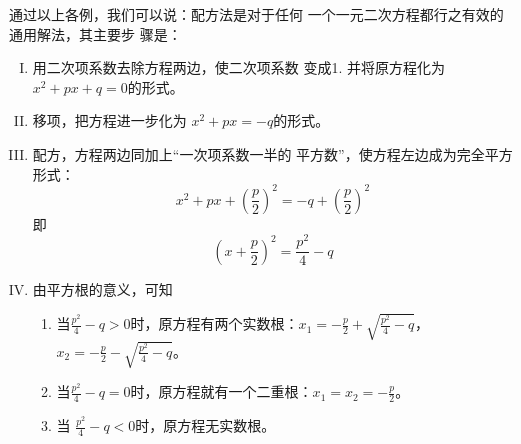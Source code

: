 通过以上各例，我们可以说：配方法是对于任何
一个一元二次方程都行之有效的通用解法，其主要步
骤是：
\begin{blk}{}
\begin{enumerate}[I. ]
    \item 用二次项系数去除方程两边，使二次项系数
    变成1. 并将原方程化为$x^2+px+q=0$的形式。
    \item 移项，把方程进一步化为
    $x^2+px=-q$的形式。
    \item 配方，方程两边同加上“一次项系数一半的
    平方数”，使方程左边成为完全平方形式：
    \[x^2+px+\left(\frac{p}{2}\right)^2=-q+\left(\frac{p}{2}\right)^2\]
    即
    \[\left(x+\frac{p}{2}\right)^2=\frac{p^2}{4}-q\]
    \item 由平方根的意义，可知
\begin{enumerate}[1.]
    \item 当$\frac{p^2}{4}-q>0$时，原方程有两个实数根：$x_1=-\frac{p}{2}+\sqrt{\frac{p^2}{4}-q}$，$x_2=-\frac{p}{2}-\sqrt{\frac{p^2}{4}-q}$。
    \item 当$\frac{p^2}{4}-q=0$时，原方程就有一个二重根：$x_1=x_2=-\frac{p}{2}$。
    \item 当
    $\frac{p^2}{4}-q<0$时，原方程无实数根。
\end{enumerate}
\end{enumerate}
\end{blk}

